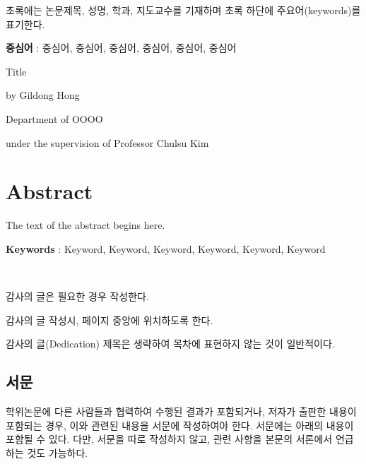 \documentclass[11pt]{report}
\numberwithin{figure}{section}
\theoremstyle{plain}
\theoremstyle{definition}
\theoremstyle{corollary}
\theoremstyle{definition}
\theoremstyle{plain}
\theoremstyle{definition}
\theoremstyle{plain}
\begin{document}
초록에는 논문제목, 성명, 학과, 지도교수를 기재하며 초록 하단에 주요어(keywords)를 표기한다. 

\par\vspace{100pt}

\textbf{중심어} : 중심어, 중심어, 중심어, 중심어, 중심어, 중심어

\newpage
\begin{center}
\LARGE Title
\par\vspace{20pt}
\doublespacing
\normalsize by Gildong Hong\par
Department of OOOO\par
under the supervision of Professor Chulsu Kim

\par\vspace{20pt}
\section*{Abstract}
\end{center}

\justifying %
\doublespacing
\normalsize
The text of the abstract begins here. 
\par\vspace{10pt}

\textbf{Keywords} : Keyword, Keyword, Keyword, Keyword, Keyword, Keyword

\newpage
~
\vspace{5.5cm} \par
\begin{center}
감사의 글은 필요한 경우 작성한다.\par
감사의 글 작성시, 페이지 중앙에 위치하도록 한다.\par
감사의 글(Dedication) 제목은 생략하여 목차에 표현하지 않는 것이 일반적이다.
\end{center}

\newpage
\begin{center}
\section*{서문}
\end{center}

\normalsize
학위논문에 다른 사람들과 협력하여 수행된 결과가 포함되거나, 저자가 출판한 내용이 포함되는 경우, 이와 관련된 내용을 서문에 작성하여야 한다. 서문에는 아래의 내용이 포함될 수 있다. 다만, 서문을 따로 작성하지 않고, 관련 사항을 본문의 서론에서 언급하는 것도 가능하다. \par
\end{document}

